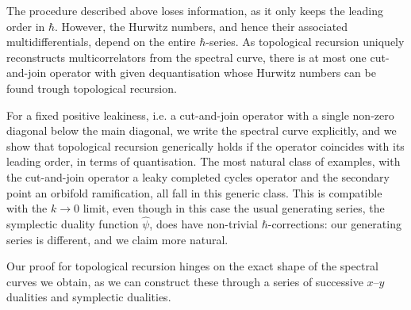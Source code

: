 \documentclass[10pt,a4paper,oneside,no-math,reqno]{amsart}%
\theoremstyle{plain}
\theoremstyle{definition}
\theoremstyle{remark}
\numberwithin{equation}{section}
\newcommand{\mb}[1]{\mathbb{#1}}
\newcommand{\1}{\mathds{1}}
\renewcommand{\P}{\mb{P}}
\newcommand{\<}{\langle}
\renewcommand{\>}{\rangle}
\begin{document}
The procedure described above loses information, as it only keeps the leading order in $\hbar$. However, the Hurwitz numbers, and hence their associated multidifferentials, depend on the entire $ \hbar$-series. As topological recursion uniquely reconstructs multicorrelators from the spectral curve, there is at most one cut-and-join operator with given dequantisation whose Hurwitz numbers can be found trough topological recursion.

For a fixed positive leakiness, i.e. a cut-and-join operator with a single non-zero diagonal below the main diagonal, we write the spectral curve explicitly, and we show that topological recursion generically holds if the operator coincides with its leading order, in terms of quantisation. The most natural class of examples, with the cut-and-join operator a leaky completed cycles operator and the secondary point an orbifold ramification, all fall in this generic class. This is compatible with the $ k \to 0$ limit, even though in this case the usual generating series, the symplectic duality function $ \hat{\psi}$, does have non-trivial $\hbar$-corrections: our generating series is different, and we claim more natural.\par
Our proof for topological recursion hinges on the exact shape of the spectral curves we obtain, as we can construct these through a series of successive $x$--$y$ dualities and symplectic dualities.

\end{document}
